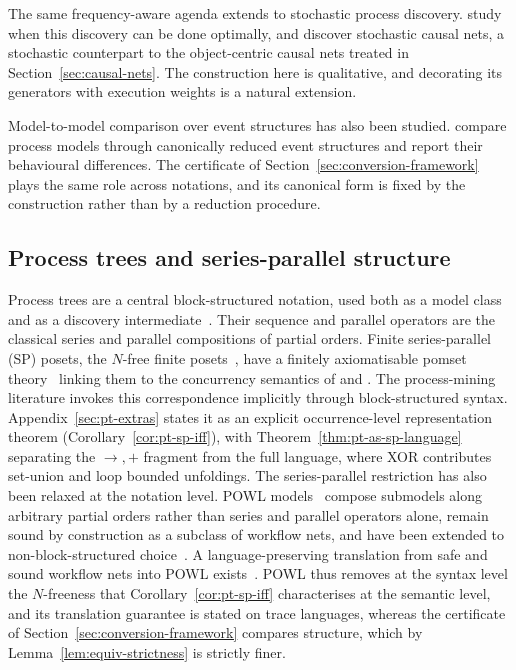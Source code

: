 The same frequency-aware agenda extends to stochastic process discovery. \citet{leemansStochasticProcessDiscovery2024} study when this discovery can be done optimally, and
\citet{liDiscoveringStochasticCausal2025} discover stochastic causal nets, a stochastic
counterpart to the object-centric causal nets treated in Section~\ref{sec:causal-nets}. The
construction here is qualitative, and decorating its generators with execution weights is a natural
extension.

Model-to-model comparison over event structures has also been studied. \citet{armas-cervantesBehavioralComparisonProcess2014} compare process models through
canonically reduced event structures and report their behavioural differences. The certificate of
Section~\ref{sec:conversion-framework} plays the same role across notations, and its canonical form
is fixed by the construction rather than by a reduction procedure.

\subsection{Process trees and series-parallel structure}\label{subsec:pt-sp-related}

Process trees are a central block-structured notation, used both as a model class and as a discovery
intermediate~\cite{leemansDiscoveringBlockStructuredProcess2013,buijsQualityDimensionsProcess2014}.
Their sequence and parallel operators are the classical series and parallel compositions of partial
orders. Finite series-parallel (SP) posets, the $N$-free finite
posets~\cite{valdesRecognitionSeriesParallel1982,mohringComputationallyTractableClasses1989}, have a
finitely axiomatisable pomset theory~\cite{gischerEquationalTheoryPomsets1988} linking them to the
concurrency semantics of \citet{prattModelingConcurrencyPartial1986} and
\citet{lodayaSeriesParallelLanguages2000}. The process-mining literature invokes this
correspondence implicitly through block-structured syntax.
Appendix~\ref{sec:pt-extras} states it as an explicit occurrence-level representation theorem
(Corollary~\ref{cor:pt-sp-iff}), with Theorem~\ref{thm:pt-as-sp-language} separating the $\to,+$
fragment from the full language, where XOR contributes set-union and loop bounded unfoldings.
The series-parallel restriction has also been relaxed at the notation level. POWL
models~\cite{kouraniPOWLPartiallyOrdered2023} compose submodels along arbitrary partial orders
rather than series and parallel operators alone, remain sound by construction as a subclass of
workflow nets, and have been extended to non-block-structured
choice~\cite{kouraniUnlockingNonBlockStructuredDecisions2025}. A language-preserving translation from safe
and sound workflow nets into POWL exists~\cite{kouraniTranslatingWorkflowNets2025}. POWL thus
removes at the syntax level the $N$-freeness that Corollary~\ref{cor:pt-sp-iff} characterises at
the semantic level, and its translation guarantee is stated on trace languages, whereas the
certificate of Section~\ref{sec:conversion-framework} compares structure, which by
Lemma~\ref{lem:equiv-strictness} is strictly finer.

